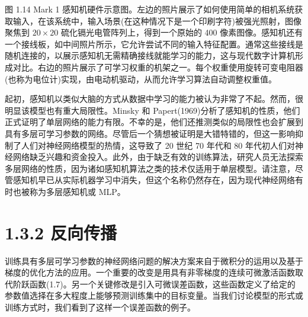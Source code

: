 \documentclass[10pt]{article}
\begin{document}
图 1.14 Mark 1 感知机硬件示意图。左边的照片展示了如何使用简单的相机系统获取输入，在该系统中，输入场景(在这种情况下是一个印刷字符)被强光照射，图像聚焦到 \({20} \times  {20}\) 硫化镉光电管阵列上，得到一个原始的 400 像素图像。感知机还有一个接线板，如中间照片所示，它允许尝试不同的输入特征配置。通常这些接线是随机连接的，以展示感知机无需精确接线就能学习的能力，这与现代数字计算机形成对比。右边的照片展示了可学习权重的机架之一。每个权重使用旋转可变电阻器(也称为电位计)实现，由电动机驱动，从而允许学习算法自动调整权重值。

起初，感知机以类似大脑的方式从数据中学习的能力被认为非常了不起。然而，很明显该模型也有重大局限性。Minsky 和 Papert(1969)分析了感知机的性质，他们正式证明了单层网络的能力有限。不幸的是，他们还推测类似的局限性也会扩展到具有多层可学习参数的网络。尽管后一个猜想被证明是大错特错的，但这一影响抑制了人们对神经网络模型的热情，这导致了 20 世纪 70 年代和 80 年代初人们对神经网络缺乏兴趣和资金投入。此外，由于缺乏有效的训练算法，研究人员无法探索多层网络的性质，因为诸如感知机算法之类的技术仅适用于单层模型。请注意，尽管感知机早已从实际机器学习中消失，但这个名称仍然存在，因为现代神经网络有时也被称为多层感知机或 MLP。

\section*{1.3.2 反向传播}

训练具有多层可学习参数的神经网络问题的解决方案来自于微积分的运用以及基于梯度的优化方法的应用。一个重要的改变是用具有非零梯度的连续可微激活函数取代阶跃函数(1.7)。另一个关键修改是引入可微误差函数，这些函数定义了给定的参数值选择在多大程度上能够预测训练集中的目标变量。当我们讨论模型的形式或训练方式时，我们看到了这样一个误差函数的例子。
\end{document}
